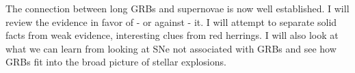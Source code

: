 


\bigskip



\bigskip

\noindent The connection between long GRBs and supernovae is now well established. I will review the evidence in favor of - or against - it. I will attempt to separate solid facts from  weak evidence, interesting clues from red herrings. I will also look at what we  can learn from looking at SNe not associated with GRBs and see how GRBs fit into the broad picture of stellar explosions.

